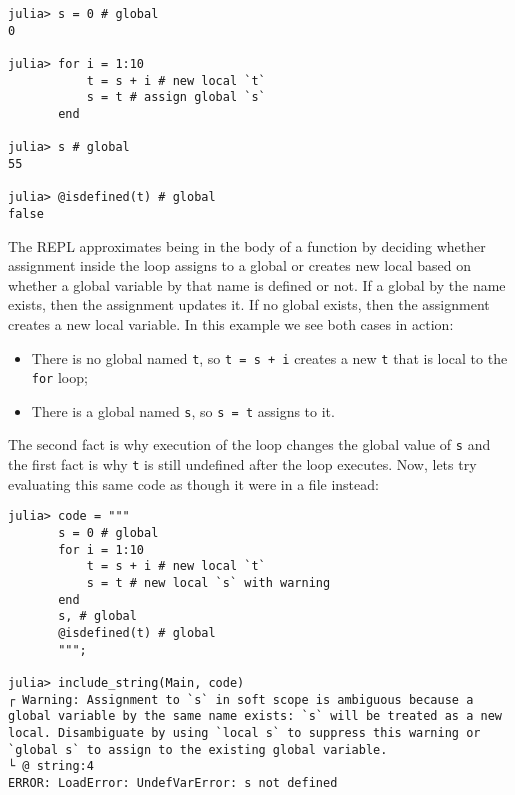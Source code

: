 \begin{verbatim}
julia> s = 0 # global
0

julia> for i = 1:10
           t = s + i # new local `t`
           s = t # assign global `s`
       end

julia> s # global
55

julia> @isdefined(t) # global
false
\end{verbatim}



The REPL approximates being in the body of a function by deciding whether assignment inside the loop assigns to a global or creates new local based on whether a global variable by that name is defined or not. If a global by the name exists, then the assignment updates it. If no global exists, then the assignment creates a new local variable. In this example we see both cases in action:



\begin{itemize}
\item There is no global named \texttt{t}, so \texttt{t = s + i} creates a new \texttt{t} that is local to the \texttt{for} loop;


\item There is a global named \texttt{s}, so \texttt{s = t} assigns to it.

\end{itemize}


The second fact is why execution of the loop changes the global value of \texttt{s} and the first fact is why \texttt{t} is still undefined after the loop executes. Now, let{\textquotesingle}s try evaluating this same code as though it were in a file instead:




\begin{verbatim}
julia> code = """
       s = 0 # global
       for i = 1:10
           t = s + i # new local `t`
           s = t # new local `s` with warning
       end
       s, # global
       @isdefined(t) # global
       """;

julia> include_string(Main, code)
┌ Warning: Assignment to `s` in soft scope is ambiguous because a global variable by the same name exists: `s` will be treated as a new local. Disambiguate by using `local s` to suppress this warning or `global s` to assign to the existing global variable.
└ @ string:4
ERROR: LoadError: UndefVarError: s not defined
\end{verbatim}



